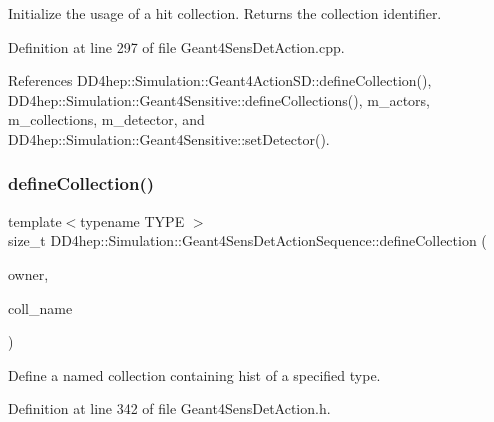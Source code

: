 Initialize the usage of a hit collection. Returns the collection identifier. 



Definition at line 297 of file Geant4\+Sens\+Det\+Action.\+cpp.



References D\+D4hep\+::\+Simulation\+::\+Geant4\+Action\+S\+D\+::define\+Collection(), D\+D4hep\+::\+Simulation\+::\+Geant4\+Sensitive\+::define\+Collections(), m\+\_\+actors, m\+\_\+collections, m\+\_\+detector, and D\+D4hep\+::\+Simulation\+::\+Geant4\+Sensitive\+::set\+Detector().

\hypertarget{class_d_d4hep_1_1_simulation_1_1_geant4_sens_det_action_sequence_a63d81e779d97e7426d0a0fc036bc6dbf}{}\label{class_d_d4hep_1_1_simulation_1_1_geant4_sens_det_action_sequence_a63d81e779d97e7426d0a0fc036bc6dbf} 
\subsubsection{\texorpdfstring{define\+Collection()}{defineCollection()}\hspace{0.1cm}{\footnotesize\ttfamily [2/2]}}
{\footnotesize\ttfamily template$<$typename T\+Y\+PE $>$ \\
size\+\_\+t D\+D4hep\+::\+Simulation\+::\+Geant4\+Sens\+Det\+Action\+Sequence\+::define\+Collection (\begin{DoxyParamCaption}\item[{\hyperlink{class_d_d4hep_1_1_simulation_1_1_geant4_sensitive}{Geant4\+Sensitive} $\ast$}]{owner,  }\item[{const std\+::string \&}]{coll\+\_\+name }\end{DoxyParamCaption})\hspace{0.3cm}{\ttfamily [inline]}}



Define a named collection containing hist of a specified type. 



Definition at line 342 of file Geant4\+Sens\+Det\+Action.\+h.

\hypertarget{class_d_d4hep_1_1_simulation_1_1_geant4_sens_det_action_sequence_a6b123f2232b47f787478fd744898ab0e}{}\label{class_d_d4hep_1_1_simulation_1_1_geant4_sens_det_action_sequence_a6b123f2232b47f787478fd744898ab0e} 
